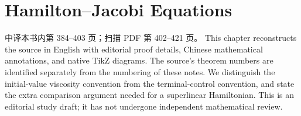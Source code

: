 \chapter{\texorpdfstring{Hamilton--Jacobi Equations}{Hamilton-Jacobi Equations}}
\label{chap:hamilton-jacobi-equations}
{中译本书内第 384--403 页；扫描 PDF 第 402--421 页。}
\noindent This chapter reconstructs the source in English with editorial
proof details, Chinese mathematical annotations, and native TikZ diagrams.
The source's theorem numbers are identified separately from the numbering
of these notes. We distinguish the initial-value viscosity convention from
the terminal-control convention, and state the extra comparison argument
needed for a superlinear Hamiltonian. This is an editorial study draft;
it has not undergone independent mathematical review.






